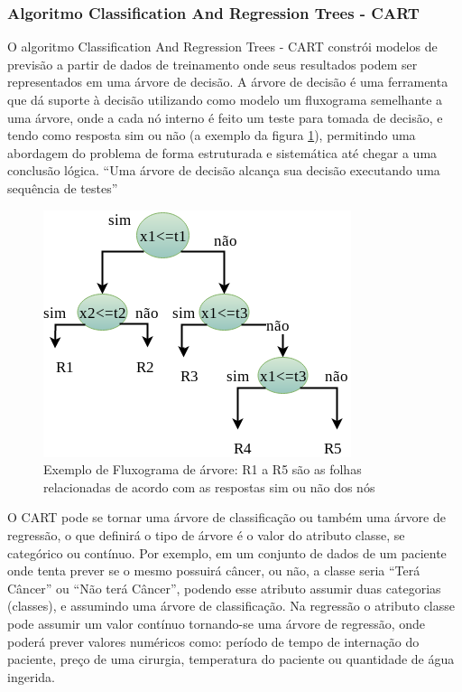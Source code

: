 \subsubsection{Algoritmo Classification And Regression Trees  - CART}\label{cap:refTeor:sssec:cart}


O algoritmo Classification And Regression Trees - CART constrói modelos de previsão a partir de dados de treinamento onde seus resultados podem ser representados em uma árvore de decisão. A árvore de decisão é uma ferramenta que dá suporte à decisão utilizando como modelo um fluxograma semelhante a uma árvore, onde a cada nó interno é feito um teste para tomada de decisão, e tendo como resposta sim ou não (a exemplo da figura \ref{fig:fluxogramaarvore}), permitindo uma abordagem do problema de forma estruturada e sistemática até chegar a uma conclusão lógica. ``Uma árvore de decisão alcança sua decisão executando uma sequência de testes'' \cite[p. 811]{RusselStuart.Norvig2013}

 \begin{figure}[h!]
    \centering
      \includegraphics[scale=0.5]{figs/arvoredecisao_nos.png}
      \caption{Exemplo de Fluxograma de árvore: R1 a R5 são as folhas relacionadas de acordo com as respostas sim ou não dos nós} \label{fig:fluxogramaarvore}
\end{figure}

O  CART pode se tornar uma árvore de classificação ou também uma árvore de regressão, o que definirá o tipo de árvore é o valor do atributo classe, se categórico ou contínuo. Por exemplo, em um conjunto de dados de um paciente onde tenta prever se o mesmo possuirá câncer, ou não, a classe seria ``Terá Câncer'' ou ``Não terá Câncer'', podendo esse atributo assumir duas categorias (classes),  e assumindo uma árvore de classificação. Na regressão o atributo classe pode assumir um valor contínuo tornando-se uma árvore de regressão, onde poderá prever valores numéricos como: período de tempo de internação do paciente, preço de uma cirurgia, temperatura do paciente ou quantidade de água ingerida. 

